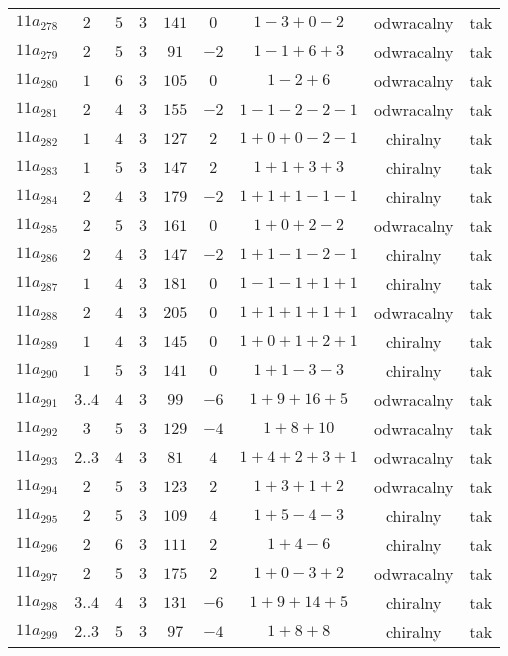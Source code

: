 \begin{longtable}{ccccccccc}
$11a_{278}$ & $2$ & $5$ & $3$ & $141$ & $0$ & $1-3+0-2$ & odwracalny & tak \\
$11a_{279}$ & $2$ & $5$ & $3$ & $91$ & $-2$ & $1-1+6+3$ & odwracalny & tak \\
$11a_{280}$ & $1$ & $6$ & $3$ & $105$ & $0$ & $1-2+6$ & odwracalny & tak \\
$11a_{281}$ & $2$ & $4$ & $3$ & $155$ & $-2$ & $1-1-2-2-1$ & odwracalny & tak \\
$11a_{282}$ & $1$ & $4$ & $3$ & $127$ & $2$ & $1+0+0-2-1$ & chiralny & tak \\
$11a_{283}$ & $1$ & $5$ & $3$ & $147$ & $2$ & $1+1+3+3$ & chiralny & tak \\
$11a_{284}$ & $2$ & $4$ & $3$ & $179$ & $-2$ & $1+1+1-1-1$ & chiralny & tak \\
$11a_{285}$ & $2$ & $5$ & $3$ & $161$ & $0$ & $1+0+2-2$ & odwracalny & tak \\
$11a_{286}$ & $2$ & $4$ & $3$ & $147$ & $-2$ & $1+1-1-2-1$ & chiralny & tak \\
$11a_{287}$ & $1$ & $4$ & $3$ & $181$ & $0$ & $1-1-1+1+1$ & chiralny & tak \\
$11a_{288}$ & $2$ & $4$ & $3$ & $205$ & $0$ & $1+1+1+1+1$ & odwracalny & tak \\
$11a_{289}$ & $1$ & $4$ & $3$ & $145$ & $0$ & $1+0+1+2+1$ & chiralny & tak \\
$11a_{290}$ & $1$ & $5$ & $3$ & $141$ & $0$ & $1+1-3-3$ & chiralny & tak \\
$11a_{291}$ & $3..4$ & $4$ & $3$ & $99$ & $-6$ & $1+9+16+5$ & odwracalny & tak \\
$11a_{292}$ & $3$ & $5$ & $3$ & $129$ & $-4$ & $1+8+10$ & odwracalny & tak \\
$11a_{293}$ & $2..3$ & $4$ & $3$ & $81$ & $4$ & $1+4+2+3+1$ & odwracalny & tak \\
$11a_{294}$ & $2$ & $5$ & $3$ & $123$ & $2$ & $1+3+1+2$ & odwracalny & tak \\
$11a_{295}$ & $2$ & $5$ & $3$ & $109$ & $4$ & $1+5-4-3$ & chiralny & tak \\
$11a_{296}$ & $2$ & $6$ & $3$ & $111$ & $2$ & $1+4-6$ & chiralny & tak \\
$11a_{297}$ & $2$ & $5$ & $3$ & $175$ & $2$ & $1+0-3+2$ & odwracalny & tak \\
$11a_{298}$ & $3..4$ & $4$ & $3$ & $131$ & $-6$ & $1+9+14+5$ & chiralny & tak \\
$11a_{299}$ & $2..3$ & $5$ & $3$ & $97$ & $-4$ & $1+8+8$ & chiralny & tak \\

\end{longtable}

